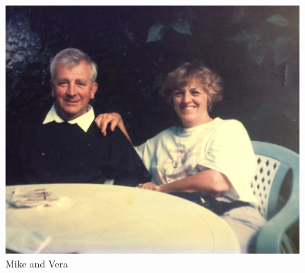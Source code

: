 \begin{figure}
  \centering
  \includegraphics[width=.9\linewidth]{pictures/cropped/Mike and Vera.jpg}
  \caption*{Mike and Vera}
\end{figure}

